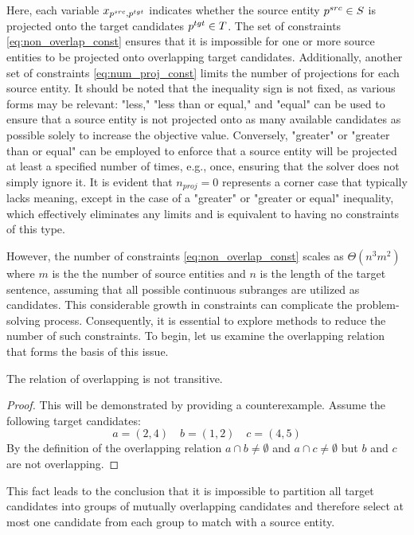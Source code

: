 Here, each variable \( x_{p^{src}, p^{tgt}} \) indicates whether
the source entity \( p^{src} \in S \) is projected onto the target
candidates \( p^{tgt} \in T \). The set of constraints \eqref{eq:non_overlap_const}
ensures that it is impossible for one or more source entities to be
projected onto overlapping target candidates. Additionally, another
set of constraints \eqref{eq:num_proj_const} limits the number of
projections for each source entity. It should be noted that the
inequality sign is not fixed, as various forms may be relevant: "less,"
"less than or equal," and "equal" can be used to ensure that a source entity
is not projected onto as many available candidates as possible solely to increase
the objective value. Conversely, "greater" or "greater than or equal" can be
employed to enforce that a source entity will be projected at least a specified
number of times, e.g., once, ensuring that the solver does not simply ignore it.
It is evident that \( n_{proj} = 0 \) represents a corner case that typically
lacks meaning, except in the case of a "greater" or "greater or equal" inequality, which effectively
eliminates any limits and is equivalent to having no constraints of this type.

However, the number of constraints \eqref{eq:non_overlap_const} scales as
\( \Theta(n^3 m^2) \) where \( m \) is the the number of source entities and
\( n \) is the length of the target sentence, assuming that all possible continuous subranges are utilized as candidates.
This considerable growth in constraints can complicate the problem-solving process.
Consequently, it is essential to explore methods to reduce the number of such
constraints. To begin, let us examine the overlapping relation that forms the
basis of this issue.
\begin{lemma} \label{lemma:not_transitive}
  The relation of overlapping is not transitive.
\end{lemma}
\begin{proof}
  This will be demonstrated by providing a counterexample.
  Assume the following target candidates:
  \[
    a = (2, 4) \quad b = (1, 2) \quad c = (4, 5)
  \]
  By the definition of the overlapping relation \( a \cap b \neq \emptyset \) and
  \( a \cap c \neq \emptyset \) but \( b \) and \( c \) are not overlapping.
\end{proof}

This fact leads to the conclusion that it is impossible to partition all target
candidates into groups of mutually overlapping candidates and therefore select at most
one candidate from each group to match with a source entity.

